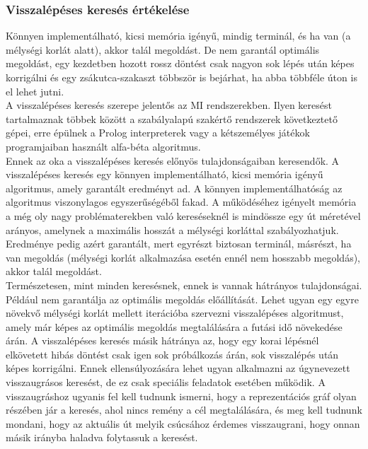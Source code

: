 \documentclass[12pt,margin=0px]{article}
\begin{document}
    \subsubsection*{Visszalépéses keresés értékelése}
    
    \noindent Könnyen implementálható, kicsi memória igényű, mindig terminál, és ha van (a mélységi korlát alatt), akkor talál megoldást. De nem garantál optimális megoldást, egy kezdetben hozott rossz döntést csak nagyon sok lépés után képes korrigálni és egy zsákutca-szakaszt többször is bejárhat, ha abba többféle úton is el lehet jutni.\\

    {\footnotesize
    \noindent {\color{blue} \faLightbulbO\ $\triangleright$ }
    \noindent A visszalépéses keresés szerepe jelentős az MI rendszerekben. Ilyen keresést tartalmaznak többek között a szabályalapú szakértő rendszerek következtető gépei, erre épülnek a Prolog interpreterek vagy a kétszemélyes játékok programjaiban használt alfa-béta algoritmus.\\

    \noindent Ennek az oka a visszalépéses keresés előnyös tulajdonságaiban keresendők. A visszalépéses keresés egy könnyen implementálható, kicsi memória igényű algoritmus, amely garantált eredményt ad. A könnyen implementálhatóság az algoritmus viszonylagos egyszerűségéből fakad. A működéséhez igényelt memória a még oly nagy problématerekben való kereséseknél is mindössze egy út méretével arányos, amelynek a maximális hosszát a mélységi korláttal szabályozhatjuk. Eredménye pedig azért garantált, mert egyrészt biztosan terminál, másrészt, ha van megoldás (mélységi korlát alkalmazása esetén ennél nem hosszabb megoldás), akkor talál megoldást.\\

    \noindent Természetesen, mint minden keresésnek, ennek is vannak hátrányos tulajdonságai. Például nem garantálja az optimális megoldás előállítását. Lehet ugyan egy egyre növekvő mélységi korlát mellett iterációba szervezni visszalépéses algoritmust, amely már képes az optimális megoldás megtalálására a futási idő növekedése árán. A visszalépéses keresés másik hátránya az, hogy egy korai lépésnél elkövetett hibás döntést csak igen sok próbálkozás árán, sok visszalépés után képes korrigálni. Ennek ellensúlyozására lehet ugyan alkalmazni az úgynevezett visszaugrásos keresést, de ez csak speciális feladatok esetében működik. A visszaugráshoz ugyanis fel kell tudnunk ismerni, hogy a reprezentációs gráf olyan részében jár a keresés, ahol nincs remény a cél megtalálására, és meg kell tudnunk mondani, hogy az aktuális út melyik csúcsához érdemes visszaugrani, hogy onnan másik irányba haladva folytassuk a keresést.\\

}
\end{document}
